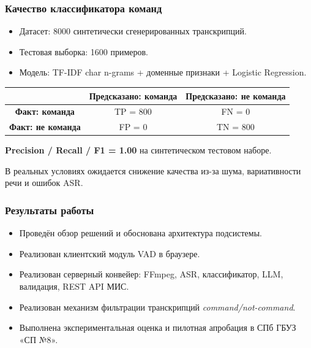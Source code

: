 \documentclass{beamer}
\begin{document}
\begin{frame}
  \frametitle{Качество классификатора команд}

  \begin{itemize}
    \item Датасет: 8000 синтетически сгенерированных транскрипций.
    \item Тестовая выборка: 1600 примеров.
    \item Модель: TF-IDF char n-grams + доменные признаки + Logistic Regression.
  \end{itemize}

  \vspace{4pt}

  \begin{center}
  \scriptsize
  \begin{tabular}{|c|c|c|}
    \hline
     & \textbf{Предсказано: команда} & \textbf{Предсказано: не команда} \\
    \hline
    \textbf{Факт: команда} & TP = 800 & FN = 0 \\
    \hline
    \textbf{Факт: не команда} & FP = 0 & TN = 800 \\
    \hline
  \end{tabular}
  \end{center}

  \vspace{4pt}
  \textbf{Precision / Recall / F1 = 1.00} на синтетическом тестовом наборе.

  \vspace{3pt}
  {\scriptsize В реальных условиях ожидается снижение качества из-за шума, вариативности речи и ошибок ASR.}

\end{frame}

\begin{frame}
  \frametitle{Результаты работы}
  \begin{itemize}
    \item Проведён обзор решений и обоснована архитектура подсистемы.
    \item Реализован клиентский модуль VAD в браузере.
    \item Реализован серверный конвейер: FFmpeg, ASR, классификатор, LLM, валидация, REST API МИС.
    \item Реализован механизм фильтрации транскрипций \textit{command/not-command}.
    \item Выполнена экспериментальная оценка и пилотная апробация в СПб ГБУЗ «СП №8».
  \end{itemize}
\end{frame}
\end{document}
